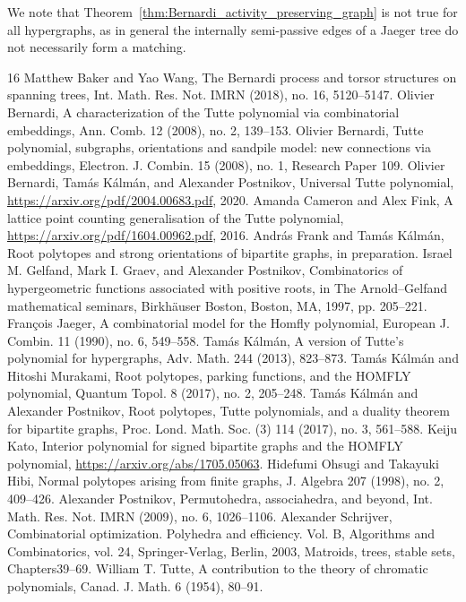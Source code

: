 \documentclass[10pt]{amsart}
\theoremstyle{definition}\newtheorem{defi}[theo]{Definition}
\theoremstyle{remark}\newtheorem{rema}[theo]{Remark}
\begin{document}
We note that Theorem~\ref{thm:Bernardi_activity_preserving_graph} is not true for all hypergraphs, as in general the internally semi-passive edges of a Jaeger tree do not necessarily form a matching.

\begin{thebibliography}{16}
 Matthew Baker and Yao Wang, The Bernardi process and torsor structures on spanning trees, Int. Math. Res. Not. IMRN (2018), no. 16, 5120--5147.
 Olivier Bernardi, A characterization of the Tutte polynomial via combinatorial embeddings, Ann. Comb. 12 (2008), no. 2, 139--153.
 Olivier Bernardi, Tutte polynomial, subgraphs, orientations and sandpile model: new connections via embeddings, Electron. J. Combin. 15 (2008), no. 1, Research Paper 109.
 Olivier Bernardi, Tamás Kálmán, and Alexander Postnikov, Universal Tutte polynomial, \url{https://arxiv.org/pdf/2004.00683.pdf}, 2020.
 Amanda Cameron and Alex Fink, A lattice point counting generalisation of the Tutte polynomial, \url{https://arxiv.org/pdf/1604.00962.pdf}, 2016.
 András Frank and Tamás Kálmán, Root polytopes and strong orientations of bipartite graphs, in preparation.
 Israel M. Gelfand, Mark I. Graev, and Alexander Postnikov, Combinatorics of hypergeometric functions associated with positive roots, in The Arnold--Gelfand mathematical seminars, Birkhäuser Boston, Boston, MA, 1997, pp. 205--221.
 François Jaeger, A combinatorial model for the Homfly polynomial, European J. Combin. 11 (1990), no. 6, 549--558.
 Tamás Kálmán, A version of Tutte’s polynomial for hypergraphs, Adv. Math. 244 (2013), 823--873.
 Tamás Kálmán and Hitoshi Murakami, Root polytopes, parking functions, and the HOMFLY polynomial, Quantum Topol. 8 (2017), no. 2, 205--248.
 Tamás Kálmán and Alexander Postnikov, Root polytopes, Tutte polynomials, and a duality theorem for bipartite graphs, Proc. Lond. Math. Soc. (3) 114 (2017), no. 3, 561--588.
 Keiju Kato, Interior polynomial for signed bipartite graphs and the HOMFLY polynomial, \url{https://arxiv.org/abs/1705.05063}.
 Hidefumi Ohsugi and Takayuki Hibi, Normal polytopes arising from finite graphs, J. Algebra 207 (1998), no. 2, 409--426.
 Alexander Postnikov, Permutohedra, associahedra, and beyond, Int. Math. Res. Not. IMRN (2009), no. 6, 1026--1106.
 Alexander Schrijver, Combinatorial optimization. Polyhedra and efficiency. Vol. B, Algorithms and Combinatorics, vol. 24, Springer-Verlag, Berlin, 2003, Matroids, trees, stable sets, Chapters39--69.
 William T. Tutte, A contribution to the theory of chromatic polynomials, Canad. J. Math. 6 (1954), 80--91.
\end{thebibliography}
\end{document}
